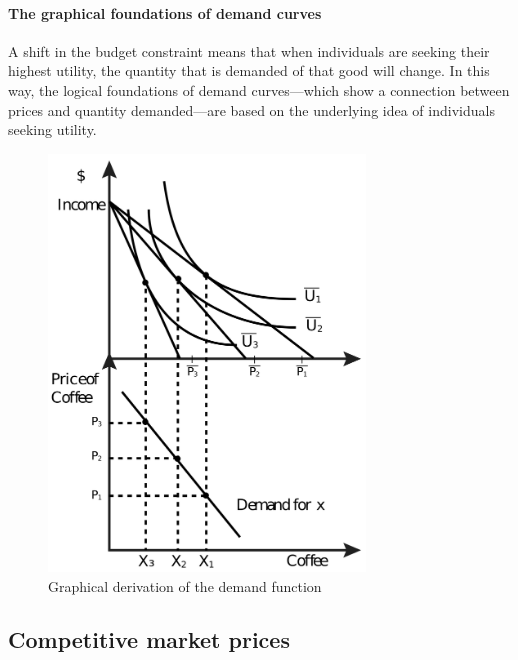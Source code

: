 \documentclass[
  12pt,
  oneside]{book}
\theoremstyle{definition}
\theoremstyle{definition}
\theoremstyle{definition}
\theoremstyle{definition}
\theoremstyle{remark}
\begin{document}
\hypertarget{the-graphical-foundations-of-demand-curves}{%
\paragraph*{The graphical foundations of demand curves}\label{the-graphical-foundations-of-demand-curves}}

A shift in the budget constraint means that when individuals are seeking their highest utility, the quantity that is demanded of that good will change. In this way, the logical foundations of demand curves---which show a connection between prices and quantity demanded---are based on the underlying idea of individuals seeking utility.

\begin{figure}
\centering
\includegraphics[width=0.75\textwidth,height=\textheight]{fig/demandderivation.png}
\caption{\label{fig:demandderivation} Graphical derivation of the demand function}
\end{figure}

\hypertarget{competitive-market-prices}{%
\subsection{Competitive market prices}\label{competitive-market-prices}}
\end{document}
